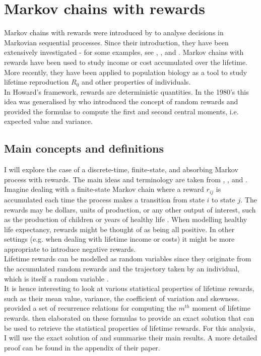 \documentclass[\main/main.tex]{subfiles}
\begin{document}
\newpage
\section{Markov chains with rewards}

Markov chains with rewards were introduced by \cite{Howard1960} to analyse decisions in Markovian sequential processes. Since their introduction, they have been extensively investigated - for some examples, see \cite{Howard1960}, \cite{Puterman1994}, and \cite{Sheskin2010}. Markov chains with rewards have been used to study income or cost accumulated over the lifetime. More recently, they have been applied to population biology as a tool to study lifetime reproduction $R_0$ \citep{Caswell2011, VanDaalen2015, VanDaalen2017} and other properties of individuals.\\

In Howard's framework, rewards are deterministic quantities. In the 1980's this idea was generalised by \cite{Benito1982} who introduced the concept of random rewards and provided the formulas to compute the first and second central moments, i.e. expected value and variance.


\subsection{Main concepts and definitions}
I will explore the case of a discrete-time, finite-state, and absorbing Markov process with rewards. The main ideas and terminology are taken from \cite{Howard1960}, \cite{Caswell2011}, and \cite{VanDaalen2017}.\\

\noindent Imagine dealing with a finite-state Markov chain where a reward $r_{ij}$ is accumulated each time the process makes a transition from state $i$ to state $j$. The rewards may be dollars, units of production, or any other output of interest, such as the production of children \citep{Caswell2011, VanDaalen2015, VanDaalen2017} or years of healthy life \citep{Caswell2018}.
When modelling healthy life expectancy, rewards might be thought of as being all positive. In other settings (e.g. when dealing with lifetime income or costs) it might be more appropriate to introduce negative rewards.\\

Lifetime rewards can be modelled as random variables since they originate from the accumulated random rewards and the trajectory taken by an individual, which is itself a random variable  \citep{Caswell2011}.\\
It is hence interesting to look at various statistical properties of lifetime rewards, such as their mean value, variance, the coefficient of variation and skewness. \cite{Caswell2011} provided a set of recurrence relations for computing the $m^{th}$ moment of lifetime rewards. \cite{VanDaalen2017} then elaborated on these formulas to provide an exact solution that can be used to retrieve the statistical properties of lifetime rewards.  For this analysis, I will use the exact solution of \cite{VanDaalen2017} and summarise their main results. A more detailed proof can be found in the appendix of their paper.\\
\end{document}
